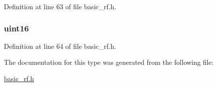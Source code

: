 Definition at line 63 of file basic\_\-rf.h.

\hypertarget{typebasic_rf_cfg__t_a50930cc6b209d3f2b142839dcfcd1f5f}{
\subsubsection[{panId}]{ {\bfseries uint16 } }}
\label{typebasic_rf_cfg__t_a50930cc6b209d3f2b142839dcfcd1f5f}


Definition at line 64 of file basic\_\-rf.h.



The documentation for this type was generated from the following file:\begin{DoxyCompactItemize}
\item 
\hyperlink{basic__rf_8h}{basic\_\-rf.h}\end{DoxyCompactItemize}
